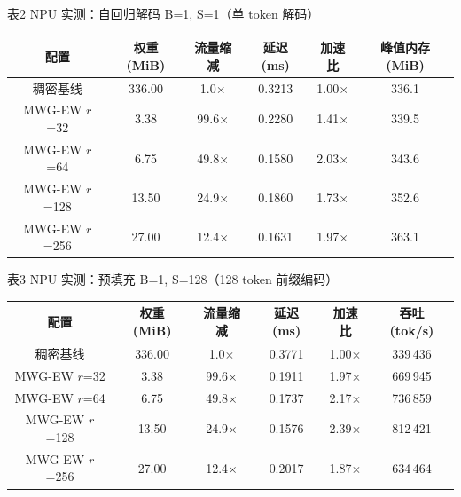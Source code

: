 \documentclass[UTF8,a4paper,12pt]{ctexart}
\newcommand{\cmtablecaption}[1]{%
  {\centering\fangsong\fontsize{10.5pt}{16pt}\selectfont #1\par}%
}
\begin{document}


\begin{center}
\cmtablecaption{表2 NPU 实测：自回归解码 B=1, S=1（单 token 解码）}
\vspace{4pt}
\small
\begin{tabular}{cccccc}
\hline
配置 & 权重 (MiB) & 流量缩减 & 延迟 (ms) & 加速比 & 峰值内存 (MiB) \\
\hline
稠密基线    & 336.00 & 1.0$\times$      & 0.3213 & 1.00$\times$ & 336.1 \\
MWG-EW $r$=32  & 3.38   & 99.6$\times$ & 0.2280 & 1.41$\times$ & 339.5 \\
MWG-EW $r$=64  & 6.75   & 49.8$\times$ & 0.1580 & 2.03$\times$ & 343.6 \\
MWG-EW $r$=128 & 13.50  & 24.9$\times$ & 0.1860 & 1.73$\times$ & 352.6 \\
MWG-EW $r$=256 & 27.00  & 12.4$\times$ & 0.1631 & 1.97$\times$ & 363.1 \\
\hline
\end{tabular}
\normalsize
\end{center}

\begin{center}
\cmtablecaption{表3 NPU 实测：预填充 B=1, S=128（128 token 前缀编码）}
\vspace{4pt}
\small
\begin{tabular}{cccccc}
\hline
配置 & 权重 (MiB) & 流量缩减 & 延迟 (ms) & 加速比 & 吞吐 (tok/s) \\
\hline
稠密基线    & 336.00 & 1.0$\times$      & 0.3771 & 1.00$\times$ & 339\,436 \\
MWG-EW $r$=32  & 3.38   & 99.6$\times$ & 0.1911 & 1.97$\times$ & 669\,945 \\
MWG-EW $r$=64  & 6.75   & 49.8$\times$ & 0.1737 & 2.17$\times$ & 736\,859 \\
MWG-EW $r$=128 & 13.50  & 24.9$\times$ & 0.1576 & 2.39$\times$ & 812\,421 \\
MWG-EW $r$=256 & 27.00  & 12.4$\times$ & 0.2017 & 1.87$\times$ & 634\,464 \\
\hline
\end{tabular}
\normalsize
\end{center}
\end{document}
